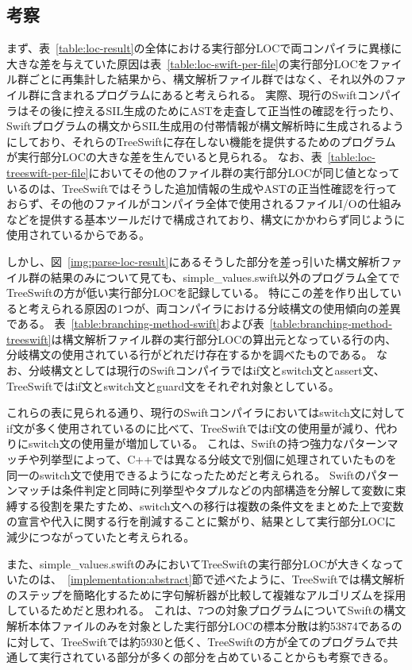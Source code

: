 \subsection{考察}

まず、表~\ref{table:loc-result}の全体における実行部分LOCで両コンパイラに異様に大きな差を与えていた原因は表~\ref{table:loc-swift-per-file}の実行部分LOCをファイル群ごとに再集計した結果から、構文解析ファイル群ではなく、それ以外のファイル群に含まれるプログラムにあると考えられる。
実際、現行のSwiftコンパイラはその後に控えるSIL生成のためにASTを走査して正当性の確認を行ったり、Swiftプログラムの構文からSIL生成用の付帯情報が構文解析時に生成されるようにしており、それらのTreeSwiftに存在しない機能を提供するためのプログラムが実行部分LOCの大きな差を生んでいると見られる。
なお、表~\ref{table:loc-treeswift-per-file}においてその他のファイル群の実行部分LOCが同じ値となっているのは、TreeSwiftではそうした追加情報の生成やASTの正当性確認を行っておらず、その他のファイルがコンパイラ全体で使用されるファイルI/Oの仕組みなどを提供する基本ツールだけで構成されており、構文にかかわらず同じように使用されているからである。

しかし、図~\ref{img:parse-loc-result}にあるそうした部分を差っ引いた構文解析ファイル群の結果のみについて見ても、simple\_values.swift以外のプログラム全てでTreeSwiftの方が低い実行部分LOCを記録している。
特にこの差を作り出していると考えられる原因の1つが、両コンパイラにおける分岐構文の使用傾向の差異である。
表~\ref{table:branching-method-swift}および表~\ref{table:branching-method-treeswift}は構文解析ファイル群の実行部分LOCの算出元となっている行の内、分岐構文の使用されている行がどれだけ存在するかを調べたものである。
なお、分岐構文としては現行のSwiftコンパイラではif文とswitch文とassert文、TreeSwiftではif文とswitch文とguard文をそれぞれ対象としている。

これらの表に見られる通り、現行のSwiftコンパイラにおいてはswitch文に対してif文が多く使用されているのに比べて、TreeSwiftではif文の使用量が減り、代わりにswitch文の使用量が増加している。
これは、Swiftの持つ強力なパターンマッチや列挙型によって、C++では異なる分岐文で別個に処理されていたものを同一のswitch文で使用できるようになったためだと考えられる。
Swiftのパターンマッチは条件判定と同時に列挙型やタプルなどの内部構造を分解して変数に束縛する役割を果たすため、switch文への移行は複数の条件文をまとめた上で変数の宣言や代入に関する行を削減することに繋がり、結果として実行部分LOCに減少につながっていたと考えられる。

また、simple\_values.swiftのみにおいてTreeSwiftの実行部分LOCが大きくなっていたのは、~\ref{implementation:abstract}節で述べたように、TreeSwiftでは構文解析のステップを簡略化するために字句解析器が比較して複雑なアルゴリズムを採用しているためだと思われる。
これは、7つの対象プログラムについてSwiftの構文解析本体ファイルのみを対象とした実行部分LOCの標本分散は約53874であるのに対して、TreeSwiftでは約5930と低く、TreeSwiftの方が全てのプログラムで共通して実行されている部分が多くの部分を占めていることからも考察できる。

